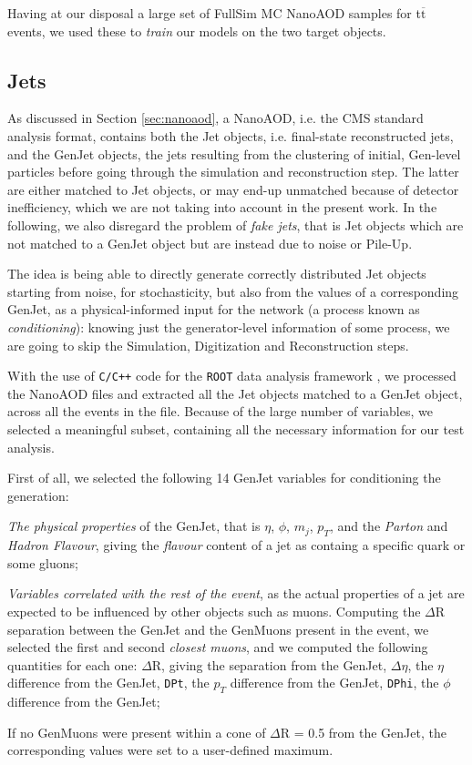 Having at our disposal a large set of FullSim MC NanoAOD samples for t$\overline{\text{t}}$ events, we used these to \emph{train} our models on the two target objects.

\subsection{Jets}

As discussed in Section \ref{sec:nanoaod}, a NanoAOD, i.e. the CMS standard analysis format, contains both the Jet objects, i.e. final-state reconstructed jets, and the GenJet objects, the jets resulting from the clustering of initial, Gen-level particles before going through the simulation and reconstruction step. The latter are either matched to Jet objects, or may end-up unmatched because of detector inefficiency, which we are not taking into account in the present work. In the following, we also disregard the problem of \emph{fake jets}, that is Jet objects which are not matched to a GenJet object but are instead due to noise or Pile-Up.

The idea is being able to directly generate correctly distributed Jet objects starting from noise, for stochasticity,  but also from the values of a corresponding GenJet, as a physical-informed input for the network (a process known as \emph{conditioning}): knowing just the generator-level information of some process, we are going to skip the Simulation, Digitization and Reconstruction steps.


With the use of \texttt{C/C++} code for the \texttt{ROOT} data analysis framework \cite{Brun:491486}, we processed the NanoAOD files and extracted all the Jet objects matched to a GenJet object, across all the events in the file. Because of the large number of variables, we selected a meaningful subset, containing all the necessary information for our test analysis.

First of all, we selected the following 14 GenJet variables for conditioning the generation: 

\begin{outline}
\1 \emph{The physical properties} of the GenJet, that is $\eta$, $\phi$, $m_j$, $p_T$, and the \emph{Parton} and \emph{Hadron Flavour}, giving the \emph{flavour} content of a jet as containg a specific quark or some gluons;

\1 \emph{Variables correlated with the rest of the event}, as the actual properties of a jet are expected to be influenced by other objects such as muons. Computing the $\Delta$R separation between the GenJet and the GenMuons present in the event, we selected the first and second \emph{closest muons}, and we computed the following quantities for each one:
\2 $\Delta$R, giving the separation from the GenJet, $\Delta \eta$, the $\eta$ difference from the GenJet, \texttt{DPt}, the $p_T$ difference from the GenJet, \texttt{DPhi}, the $\phi$ difference from the GenJet;

\1 If no GenMuons were present within a cone of $\Delta$R = 0.5 from the GenJet, the corresponding values were set to a user-defined maximum.

\end{outline}

